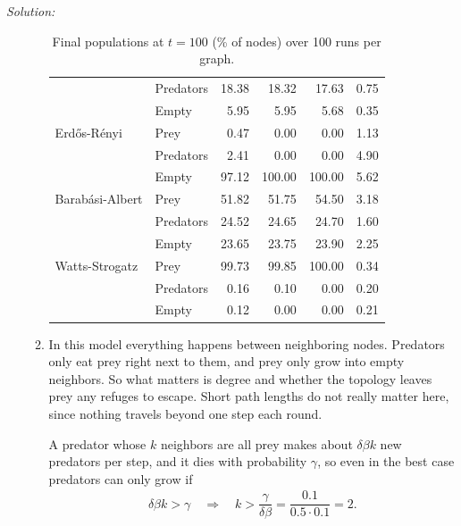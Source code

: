 \documentclass{article}
\newenvironment{solution}
    {\noindent \textit{Solution:}\vspace{1em}\\}
    {\newpage}
\begin{document}
\begin{solution}
\begin{enumerate}
\begin{enumerate}
\begin{table}[ht!]
\begin{tabular}{llrrrr}
                 & Predators & 18.38 & 18.32 & 17.63 & 0.75 \\
                 & Empty & 5.95 & 5.95 & 5.68 & 0.35 \\
                \midrule
                Erd\H{o}s-R\'enyi & Prey & 0.47 & 0.00 & 0.00 & 1.13 \\
                 & Predators & 2.41 & 0.00 & 0.00 & 4.90 \\
                 & Empty & 97.12 & 100.00 & 100.00 & 5.62 \\
                \midrule
                Barab\'asi-Albert & Prey & 51.82 & 51.75 & 54.50 & 3.18 \\
                 & Predators & 24.52 & 24.65 & 24.70 & 1.60 \\
                 & Empty & 23.65 & 23.75 & 23.90 & 2.25 \\
                \midrule
                Watts-Strogatz & Prey & 99.73 & 99.85 & 100.00 & 0.34 \\
                 & Predators & 0.16 & 0.10 & 0.00 & 0.20 \\
                 & Empty & 0.12 & 0.00 & 0.00 & 0.21 \\
                \bottomrule
            \end{tabular}
            \caption{Final populations at $t = 100$ (\% of nodes) over 100 runs per graph.}
            \label{q2bStatsTable}
        \end{table}

        \item In this model everything happens between neighboring nodes. Predators only eat prey right next to
        them, and prey only grow into empty neighbors. So what matters is degree
        and whether the topology leaves prey any refuges to escape. Short path lengths do not really matter here, since
        nothing travels beyond one step each round.

        A predator whose $k$ neighbors are all prey makes about $\delta\beta k$ new
        predators per step, and it dies with probability $\gamma$, so even in the best case predators can only grow if
        \begin{align*}
            \delta \beta k > \gamma \quad \Rightarrow \quad k > \dfrac{\gamma}{\delta\beta} = \dfrac{0.1}{0.5 \cdot 0.1} = 2.
        \end{align*}
        

\end{enumerate}
\end{enumerate}
\end{solution}
\end{document}
